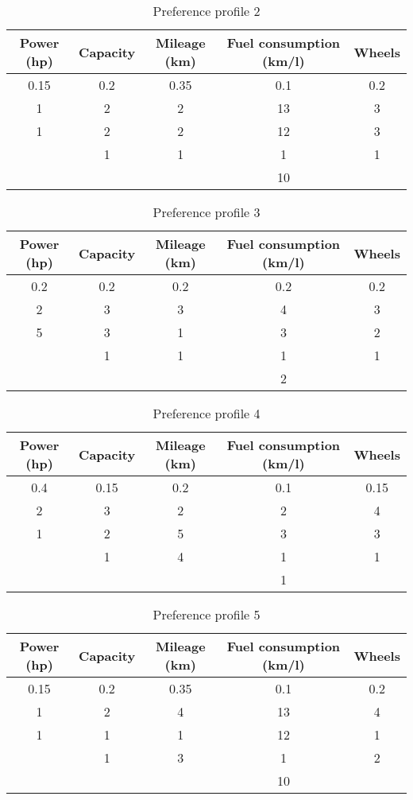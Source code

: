 \documentclass[11pt,a4paper]{report}
\begin{document}
\begin{table}[H]
\centering
\caption{Preference profile 2}
\label{tab:prefprof2}
\begin{tabular}{|c|c|c|c|c|}
\hline
Power (hp) & Capacity & Mileage (km) & Fuel consumption (km/l) & Wheels \\
\hline
0.15 & 0.2 & 0.35 & 0.1 & 0.2 \\
\hline
1 & 2 & 2 & 13 & 3 \\
1 & 2 & 2 & 12 & 3 \\
  & 1 & 1 & 1  & 1 \\
  &   &   & 10 &   \\ 
\hline
\end{tabular}
\end{table}

\begin{table}[H]
\centering
\caption{Preference profile 3}
\label{tab:prefprof3}
\begin{tabular}{|c|c|c|c|c|}
\hline
Power (hp) & Capacity & Mileage (km) & Fuel consumption (km/l) & Wheels \\
\hline
0.2 & 0.2 & 0.2 & 0.2 & 0.2 \\
\hline
2 & 3 & 3 & 4 & 3 \\
5 & 3 & 1 & 3 & 2 \\
  & 1 & 1 & 1 & 1 \\
  &   &   & 2 &   \\ 
\hline
\end{tabular}
\end{table}

\begin{table}[H]
\centering
\caption{Preference profile 4}
\label{tab:prefprof4}
\begin{tabular}{|c|c|c|c|c|}
\hline
Power (hp) & Capacity & Mileage (km) & Fuel consumption (km/l) & Wheels \\
\hline
0.4 & 0.15 & 0.2 & 0.1 & 0.15 \\
\hline
2 & 3 & 2 & 2 & 4 \\
1 & 2 & 5 & 3 & 3 \\
  & 1 & 4 & 1 & 1 \\
  &   &   & 1 &   \\ 
\hline
\end{tabular}
\end{table}

\begin{table}[H]
\centering
\caption{Preference profile 5}
\label{tab:prefprof5}
\begin{tabular}{|c|c|c|c|c|}
\hline
Power (hp) & Capacity & Mileage (km) & Fuel consumption (km/l) & Wheels \\
\hline
0.15 & 0.2 & 0.35 & 0.1 & 0.2 \\
\hline
1 & 2 & 4 & 13 & 4 \\
1 & 1 & 1 & 12 & 1 \\
  & 1 & 3 & 1  & 2 \\
  &   &   & 10 &   \\ 
\hline
\end{tabular}
\end{table}
\end{document}
